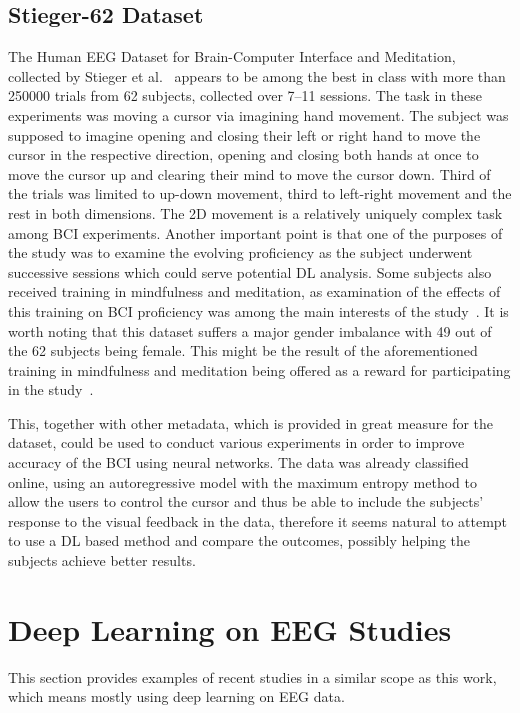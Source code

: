 \documentclass[english, he, bc, kiv, iso690alph, viewonly]{fasthesis}
\begin{document}
\subsection{Stieger-62 Dataset}
\label{subsec:stieger-62}

The Human EEG Dataset for Brain-Computer Interface and Meditation, collected by Stieger et al.~\cite{data:stieger:21} appears to be among the best in class with more than 250000 trials from 62 subjects, collected over 7--11 sessions.
The task in these experiments was moving a cursor via imagining hand movement. The subject was supposed to imagine opening and closing their left or right hand to move the cursor in the respective direction, opening and closing both hands at once to move the cursor up and clearing their mind to move the cursor down. Third of the trials was limited to up-down movement, third to left-right movement and the rest in both dimensions.
The 2D movement is a relatively uniquely complex task among BCI experiments.
Another important point is that one of the purposes of the study was to examine the evolving proficiency as the subject underwent successive sessions which could serve potential DL analysis.
Some subjects also received training in mindfulness and meditation, as examination of the effects of this training on BCI proficiency was among the main interests of the study~\cite{stieger:mindfulness:20}. It is worth noting that this dataset suffers a major gender imbalance with 49 out of the 62 subjects being female. This might be the result of the aforementioned training in mindfulness and meditation being offered as a reward for participating in the study~\cite{data:stieger:21}.

This, together with other metadata, which is provided in great measure for the dataset, could be used to conduct various experiments in order to improve accuracy of the BCI using neural networks.
The data was already classified online, using an autoregressive model with the maximum entropy method to allow the users to control the cursor and thus be able to include the subjects' response to the visual feedback in the data, therefore it seems natural to attempt to use a DL based method and compare the outcomes, possibly helping the subjects achieve better results.

\section{Deep Learning on EEG Studies}

This section provides examples of recent studies in a similar scope as this work, which means mostly using deep learning on EEG data.
\end{document}
